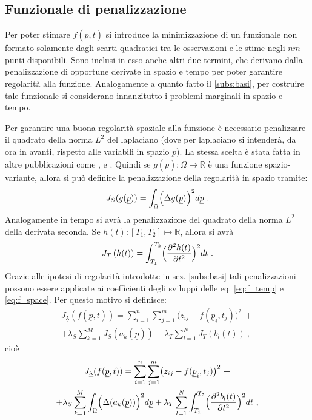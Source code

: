 \documentclass[a4paper,11pt,twoside,openright]{book}							%
\begin{document}
\subsection{Funzionale di penalizzazione}

Per poter stimare $f(\underline p,t)$ si introduce la minimizzazione di un funzionale non formato solamente dagli scarti quadratici tra le osservazioni e le stime negli $nm$ punti disponibili. Sono inclusi in esso anche altri due termini, che derivano dalla penalizzazione di opportune derivate in spazio e tempo per poter garantire regolarità alla funzione. Analogamente a quanto fatto il \ref{subs:basi}, per costruire tale funzionale si considerano innanzitutto i problemi marginali in spazio e tempo.

Per garantire una buona regolarità spaziale alla funzione è necessario penalizzare il quadrato della norma $L^2$ del laplaciano (dove per laplaciano si intenderà, da ora in avanti, rispetto alle variabili in spazio $\underline p$). La stessa scelta è stata fatta in altre pubblicazioni come \cite{art:ramsay}, \cite{art:sangalli} e \cite{art:wood}. Quindi se $g(\underline p): \Omega \mapsto \mathbb{R}$ è una funzione spazio-variante, allora si può definire la penalizzazione della regolarità in spazio tramite:
$$
J_S(g(\underline p))=\int_{\Omega} \Bigl( \Delta  g(\underline p  ) \Bigr)^2 d \underline p \ .
$$
Analogamente in tempo si avrà la penalizzazione del quadrato della norma $L^2$ della derivata seconda. Se $h(t): [T_1,T_2] \mapsto \mathbb{R}$, allora si avrà
$$
J_T\left(h(t)\right)=\int_{T_1}^{T_2} \Bigl( \frac{\partial^2   h(t)   }{\partial t ^2} \Bigr)^2 dt\ .
$$
Grazie alle ipotesi di regolarità introdotte in sez. \ref{subs:basi} tali penalizzazioni possono essere applicate ai coefficienti degli sviluppi delle eq. \ref{eq:f_temp} e \ref{eq:f_space}. Per questo motivo si definisce:
\begin{multline*}
J_{\underline \lambda }(f(\underline p,t))=\sum_{i=1}^n \sum_{j=1}^m \bigl( z_{ij} - f(\underline p_i,t_j) \bigr)^2 \ + \\
+\lambda_S  \sum_{k=1}^M J_S( a_k(\underline p)) + \lambda_T \sum_{l=1}^N J_T ( b_l(t)) \ ,
\end{multline*}
cioè
\begin{multline}
\label{eq:penalizzdisc}
J_{\underline \lambda }(f(\underline p,t))=\sum_{i=1}^n \sum_{j=1}^m \bigl( z_{ij} - f(\underline p_i,t_j) \bigr)^2 \ + \\
+\lambda_S  \sum_{k=1}^M \int_{\Omega} \Bigl( \Delta(  a_k(\underline p)  ) \Bigr)^2 d \underline p + \lambda_T \sum_{l=1}^N\int_{T_1}^{T_2} \Bigl( \frac{\partial^2   b_l(t)   }{\partial t ^2} \Bigr)^2 dt \ ,
\end{multline}
\end{document}
